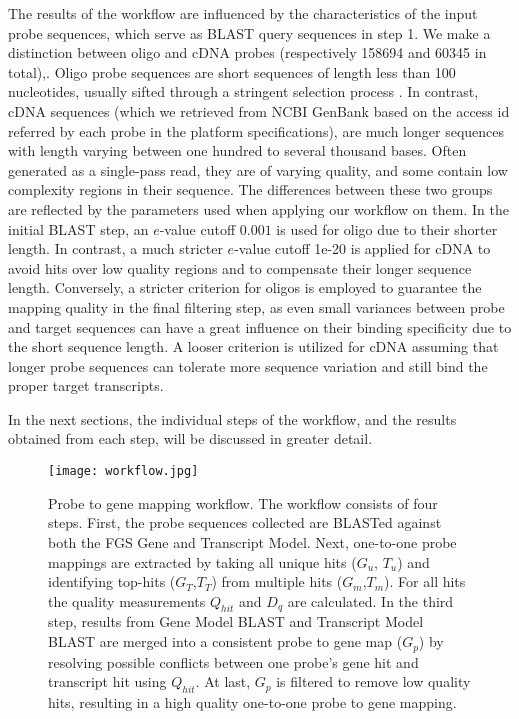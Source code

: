 The results of the workflow are influenced by the characteristics
of the input probe sequences, which serve as BLAST query
sequences in step 1. We make a distinction between oligo and cDNA
probes (respectively 158694 and 60345 in total),. Oligo probe sequences
are short sequences of length less than 100 nucleotides, usually
sifted through a stringent selection process \cite{Leparc2009,Rouillard2003}. 
In contrast, cDNA sequences (which
we retrieved from NCBI GenBank based on the access id referred by
each probe in the platform specifications), are much longer
sequences with length varying between one hundred to several
thousand bases. Often generated as a single-pass read, they are
of varying quality, and some contain low complexity regions in
their sequence. The differences between these two groups are
reflected by the parameters used when applying our workflow on
them. In the initial BLAST step, an $e$-value cutoff $0.001$ is used
for oligo due to their shorter length. In contrast, a much
stricter $e$-value cutoff 1e-20 is applied for cDNA to avoid hits
over low quality regions and to compensate their longer sequence
length. Conversely, a stricter criterion for oligos is employed
to guarantee the mapping quality in the final filtering step, as
even small variances between probe and target sequences can have
a great influence on their binding specificity due to the short
sequence length. A looser criterion is utilized for cDNA assuming
that longer probe sequences can tolerate more sequence variation
and still bind the proper target transcripts.

In the next sections, the individual steps of the workflow, and
the results obtained from each step, will be discussed in greater
detail.

\begin{figure}
	\centering
	\medskip
  	\texttt{[image: workflow.jpg]}
  	\caption[Probe to gene mapping workflow]
  	{Probe to gene mapping workflow. The workflow consists of four
  	steps. First, the probe sequences collected are BLASTed against
  	both the FGS Gene and Transcript Model. Next, one-to-one probe
  	mappings are extracted by taking all unique hits ($G_u$, $T_u$) and
  	identifying top-hits ($G_T$,$T_T$) from multiple hits ($G_m$,$T_m$). For all
  	hits the quality measurements $Q_{hit}$ and $D_q$ are calculated. In the
  	third step, results from Gene Model BLAST and Transcript Model
  	BLAST are merged into a consistent probe to gene map ($G_p$) by
  	resolving possible conflicts between one probe’s gene hit and
  	transcript hit using $Q_{hit}$. At last, $G_p$ is filtered to remove low
  	quality hits, resulting in a high quality one-to-one probe to
  	gene mapping.}
  	\label{fig:pmap}
\end{figure}


